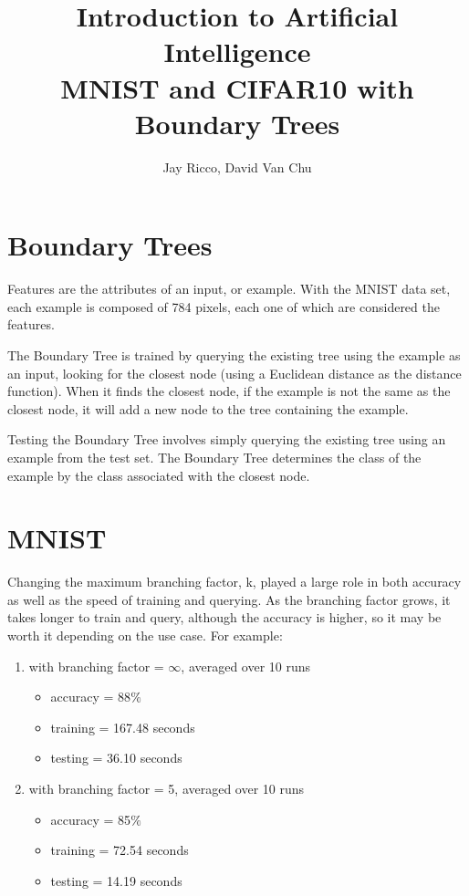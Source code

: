 \documentclass[10pt,letterpaper]{article}
\author{Jay Ricco, David Van Chu}
\title{Introduction to Artificial Intelligence\\MNIST and CIFAR10 with Boundary Trees}
\begin{document}
	\maketitle
	\section{Boundary Trees}
		\hspace{5mm}Features are the attributes of an input, or example. With the MNIST data set, each example is composed of 784 pixels, each one of which are considered the features.
		
		\vspace{5mm}
		The Boundary Tree is trained by querying the existing tree using the example as an input, looking for the closest node (using a Euclidean distance as the distance function). When it finds the closest node, if the example is not the same as the closest node, it will add a new node to the tree containing the example.
		
		\vspace{5mm}
		Testing the Boundary Tree involves simply querying the existing tree using an example from the test set. The Boundary Tree determines the class of the example by the class associated with the closest node.

	\section{MNIST}
		\hspace{5mm}Changing the maximum branching factor, k, played a large role in both accuracy as well as the speed of training and querying. As the branching factor grows, it takes longer to train and query, although the accuracy is higher, so it may be worth it depending on the use case.
		For example:
			
		\begin{enumerate}	
			\item with branching factor = $\infty$, averaged over 10 runs
				\begin{itemize}
					\item accuracy = 88$\%$
					\item training = 167.48 seconds
					\item testing = 36.10 seconds
				\end{itemize}
	 		\item with branching factor = 5, averaged over 10 runs
				\begin{itemize}
					\item accuracy = 85$\%$
					\item training = 72.54 seconds
					\item testing = 14.19 seconds
				\end{itemize}
			\end{enumerate}
		
\end{document}
